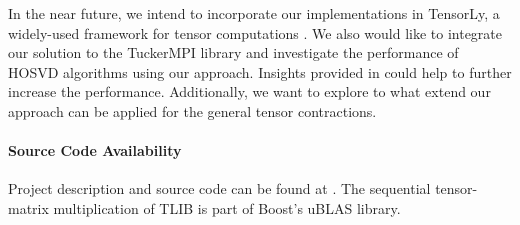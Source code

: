 In the near future, we intend to incorporate our implementations in TensorLy, a widely-used framework for tensor computations \cite{cohen:2022:tensor.computations, kossaifi:2019:tensorly}.
We also would like to integrate our solution to the TuckerMPI library \cite{ballard:2020:tuckermpi} and investigate the performance of HOSVD algorithms using our approach.
Insights provided in \cite{li:2015:input} could help to further increase the performance.
Additionally, we want to explore to what extend our approach can be applied for the general tensor contractions.

\paragraph{Source Code Availability}
Project description and source code can be found at .
The sequential tensor-matrix multiplication of TLIB is part of Boost's uBLAS library.